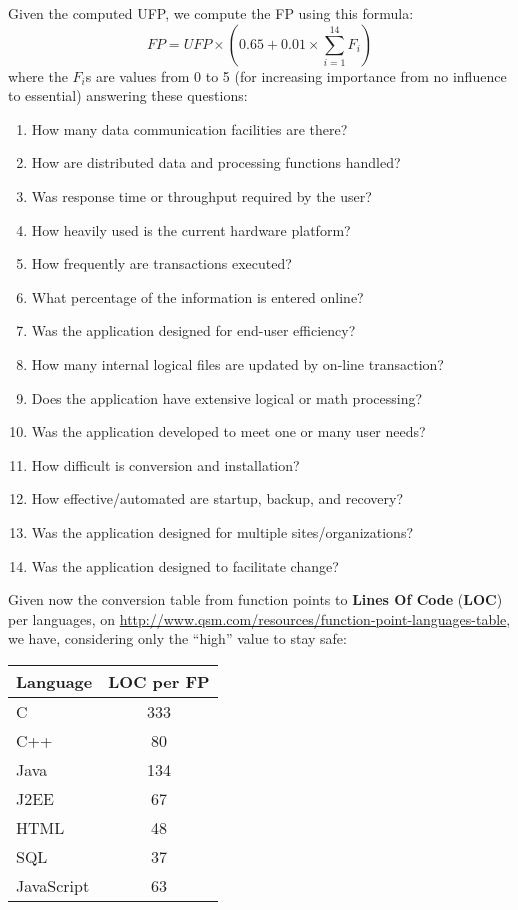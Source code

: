 \documentclass[a4paper,12pt]{book}
\begin{document}
Given the computed UFP, we compute the FP using this formula:
\[
  FP = UFP \times \left( 0.65 + 0.01 \times \sum_{i=1}^{14} F_i \right)
\]
where the $F_i$s are values from 0 to 5 (for increasing importance from no influence to essential) answering these questions:
\begin{enumerate}
  \item How many data communication facilities are there?
  \item How are distributed data and processing functions handled?
  \item Was response time or throughput required by the user?
  \item How heavily used is the current hardware platform?
  \item How frequently are transactions executed?
  \item What percentage of the information is entered online?
  \item Was the application designed for end-user efficiency?
  \item How many internal logical files are updated by on-line transaction?
  \item Does the application have extensive logical or math processing?
  \item Was the application developed to meet one or many user needs?
  \item How difficult is conversion and installation?
  \item How effective/automated are startup, backup, and recovery?
  \item Was the application designed for multiple sites/organizations?
  \item Was the application designed to facilitate change?
\end{enumerate}

Given now the conversion table from function points to \textbf{Lines Of Code} (\textbf{LOC}) per languages, on
\url{http://www.qsm.com/resources/function-point-languages-table},  we have, considering only the ``high'' value to stay safe:
\begin{center}
  \begin{tabular}{ | l | c |}
    \hline
    \textbf{Language} & \textbf{LOC per FP} \\ \hline
    C & 333 \\ \hline
    C++ & 80 \\ \hline
    Java & 134 \\ \hline
    J2EE & 67 \\ \hline
    HTML & 48 \\ \hline
    SQL & 37 \\ \hline
    JavaScript & 63 \\ \hline
  \end{tabular}
\end{center}
\end{document}
